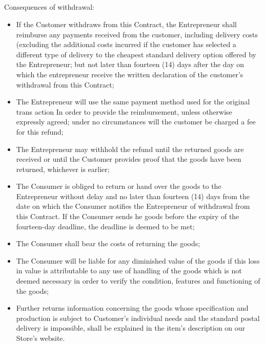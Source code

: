 			\subsection{} Consequences of withdrawal:
				\begin{itemize}
					\item If the Customer withdraws from this Contract, the Entrepreneur shall reimburse any payments received from the customer, including delivery costs (excluding the additional costs incurred if the customer has selected a different type of delivery to the cheapest standard delivery option offered by the Entrepreneur; but not later than fourteen (14) days after the day on which the entrepreneur receive the written declaration of the customer’s withdrawal from this Contract;

					\item  The Entrepreneur will use the same payment method used for the original trans action In order to provide the reimbursement, unless otherwise expressly agreed; under no circumstances will the customer be charged a fee for this refund;

					\item  The Entrepreneur may withhold the refund until the returned goods are received or until the Customer provides proof that the goods have been returned, whichever is earlier;

					\item  The Consumer is obliged to return or hand over the goods to the Entrepreneur without delay and no later than fourteen (14) days from the date on which the Consumer notifies the Entrepreneur of withdrawal from this Contract. If the Consumer sends he goods before the expiry of the fourteen-day deadline, the deadline is deemed to be met;

					\item  The Consumer shall bear the costs of returning the goods;

					\item  The Consumer will be liable for any diminished value of the goods if this loss in value is attributable to any use of handling of the goods which is not deemed necessary in order to verify the condition, features and functioning of the goods;

					\item Further returns information concerning the goods whose specification and production is subject to Customer’s individual needs and the standard postal delivery is impossible, shall be explained in the item’s description on our Store’s website.
				\end{itemize}
 
